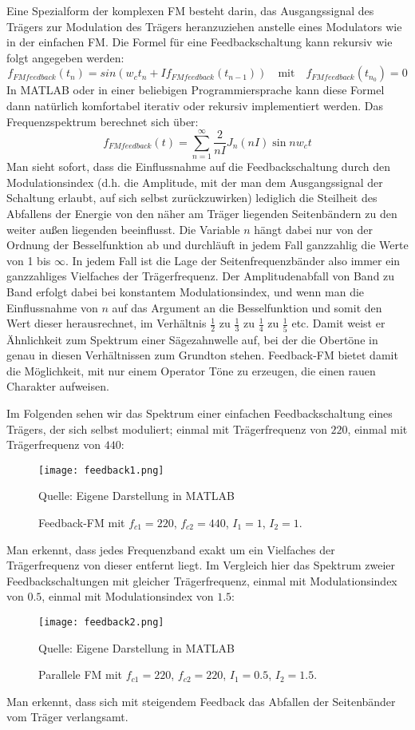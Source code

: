 Eine Spezialform der komplexen FM besteht darin, das Ausgangssignal des Trägers zur Modulation des Trägers heranzuziehen anstelle eines Modulators wie in der einfachen FM. Die Formel für eine Feedbackschaltung kann rekursiv wie folgt angegeben werden:
\begin{equation}
f_{FMfeedback}(t_{n}) = sin(w_{c}t_{n} + If_{FMfeedback}(t_{n-1})) \quad \text{mit} \quad f_{FMfeedback}(t_{n_0}) = 0
\end{equation}
In MATLAB oder in einer beliebigen Programmiersprache kann diese Formel dann natürlich komfortabel iterativ oder rekursiv implementiert werden.
Das Frequenzspektrum berechnet sich \cite{schottiWeb} über:
\begin{equation}
f_{FMfeedback}(t) = \sum_{n=1}^{\infty}\frac{2}{nI}J_n(nI)\sin{nw_{c}t}
\end{equation}
Man sieht sofort, dass die Einflussnahme auf die Feedbackschaltung durch den Modulationsindex (d.h. die Amplitude, mit der man dem Ausgangssignal der Schaltung erlaubt, auf sich selbst zurückzuwirken) lediglich die Steilheit des Abfallens der Energie von den näher am Träger liegenden Seitenbändern zu den weiter außen liegenden beeinflusst. Die Variable $n$ hängt dabei nur von der Ordnung der Besselfunktion ab und durchläuft in jedem Fall ganzzahlig die Werte von 1 bis $\infty$. In jedem Fall ist die Lage der Seitenfrequenzbänder also immer ein ganzzahliges Vielfaches der Trägerfrequenz. Der Amplitudenabfall von Band zu Band erfolgt dabei bei konstantem Modulationsindex, und wenn man die Einflussnahme von $n$ auf das Argument an die Besselfunktion und somit den Wert dieser herausrechnet, im Verhältnis $\frac{1}{2}$ zu $\frac{1}{3}$ zu $\frac{1}{4}$ zu $\frac{1}{5}$ etc. Damit weist er Ähnlichkeit zum Spektrum einer Sägezahnwelle auf, bei der die Obertöne in genau in diesen Verhältnissen zum Grundton stehen. Feedback-FM bietet damit die Möglichkeit, mit nur einem Operator Töne zu erzeugen, die einen rauen Charakter aufweisen. 

Im Folgenden sehen wir das Spektrum einer einfachen Feedbackschaltung eines Trägers, der sich selbst moduliert; einmal mit Trägerfrequenz von $220$, einmal mit Trägerfrequenz von $440$:
\FloatBarrier
\begin{figure} [ht]
\centering
  \texttt{[image: feedback1.png]}
\caption{Feedback-FM mit $f_{c1} = 220$, $f_{c2} = 440$, $I_1 = 1$, $I_2 = 1$. }
Quelle: Eigene Darstellung in MATLAB
\end{figure}
\FloatBarrier
Man erkennt, dass jedes Frequenzband exakt um ein Vielfaches der Trägerfrequenz von dieser entfernt liegt. Im Vergleich hier das Spektrum zweier Feedbackschaltungen mit gleicher Trägerfrequenz, einmal mit Modulationsindex von $0.5$, einmal mit Modulationsindex von $1.5$:
\FloatBarrier
\begin{figure} [ht]
\centering
  \texttt{[image: feedback2.png]}
\caption{Parallele FM mit $f_{c1} = 220$, $f_{c2} = 220$, $I_1 = 0.5$, $I_2 = 1.5$. }
Quelle: Eigene Darstellung in MATLAB
\end{figure}
\FloatBarrier
Man erkennt, dass sich mit steigendem Feedback das Abfallen der Seitenbänder vom Träger verlangsamt.